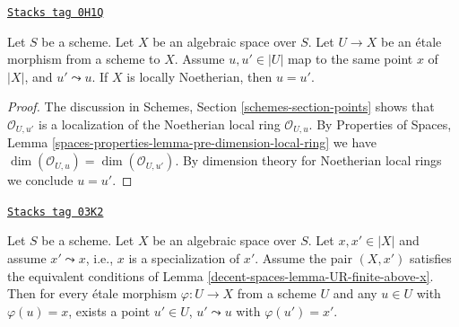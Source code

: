 \begin{lemma}
\label{decent-spaces-lemma-no-specializations-map-to-same-point-Noetherian}
\href{https://stacks.math.columbia.edu/tag/0H1Q}{\texttt{Stacks tag 0H1Q}}

Let $S$ be a scheme. Let $X$ be an algebraic space over $S$.
Let $U \to X$ be an \'etale morphism from a scheme to $X$.
Assume $u, u' \in |U|$ map to the same point $x$ of $|X|$, and
$u' \leadsto u$. If $X$ is locally Noetherian, then $u = u'$.
\end{lemma}

\begin{proof}
The discussion in Schemes, Section \ref{schemes-section-points}
shows that $\mathcal{O}_{U, u'}$ is a localization of
the Noetherian local ring $\mathcal{O}_{U, u}$.
By Properties of Spaces, Lemma
\ref{spaces-properties-lemma-pre-dimension-local-ring}
we have $\dim(\mathcal{O}_{U, u}) = \dim(\mathcal{O}_{U, u'})$.
By dimension theory for Noetherian local rings we conclude $u = u'$.
\end{proof}

\begin{lemma}[Specialization]
\label{decent-spaces-lemma-specialization}
\href{https://stacks.math.columbia.edu/tag/03K2}{\texttt{Stacks tag 03K2}}

Let $S$ be a scheme.
Let $X$ be an algebraic space over $S$.
Let $x, x' \in |X|$ and assume $x' \leadsto x$, i.e., $x$ is a
specialization of $x'$.
Assume the pair $(X, x')$ satisfies the equivalent conditions
of Lemma \ref{decent-spaces-lemma-UR-finite-above-x}.
Then for every \'etale morphism $\varphi : U \to X$ from a scheme $U$ and any
$u \in U$ with $\varphi(u) = x$, exists a point $u'\in U$,
$u' \leadsto u$ with $\varphi(u') = x'$.
\end{lemma}

